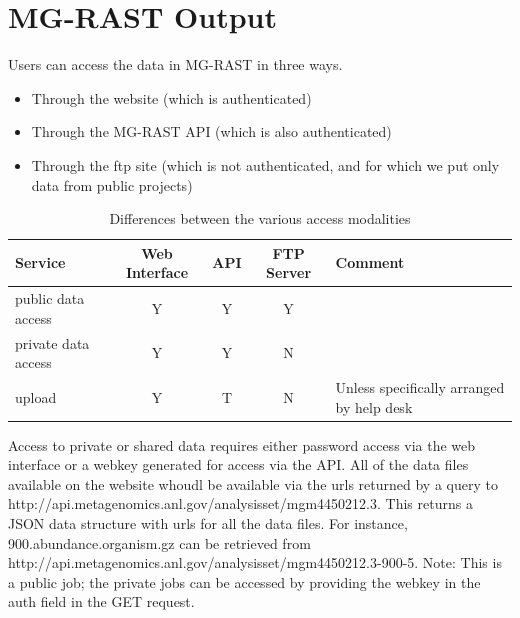\documentclass[12pt,fullpage]{report}
\begin{document}


\section{MG-RAST Output}

Users can access the data in MG-RAST in three ways.
\begin{itemize}
\item Through the website (which is authenticated)
\item Through the MG-RAST API (which is also authenticated)
\item Through the ftp site (which is not authenticated, and for which we put
only data from public projects)
\end{itemize}

\begin{table}
\caption{Differences between the various access modalities}
\label{table:access-modalities}
\begin{tabular}{l|c|c|c|l}
Service & Web Interface & API & FTP Server & Comment\\
 \hline
public data  access  	  &  Y                   &  Y     &  Y &\\
private data  access   &  Y                   &  Y     &  N &\\
upload                      &  Y                    &  T     & N & Unless specifically arranged by help desk\\
 \hline
\end{tabular}
\end{table}



Access to private or shared data requires either password access via the web interface or a webkey generated for access via the API.
All of the data files available on the website whoudl be available via the urls returned by
a query to
http://api.metagenomics.anl.gov/analysisset/mgm4450212.3.
This returns a JSON data structure with urls for all the data files. For
instance,
900.abundance.organism.gz
can be retrieved from
http://api.metagenomics.anl.gov/analysisset/mgm4450212.3-900-5.
Note: This is a public job; the private jobs can be accessed by providing the webkey
in the auth field in the GET request.
\end{document}
